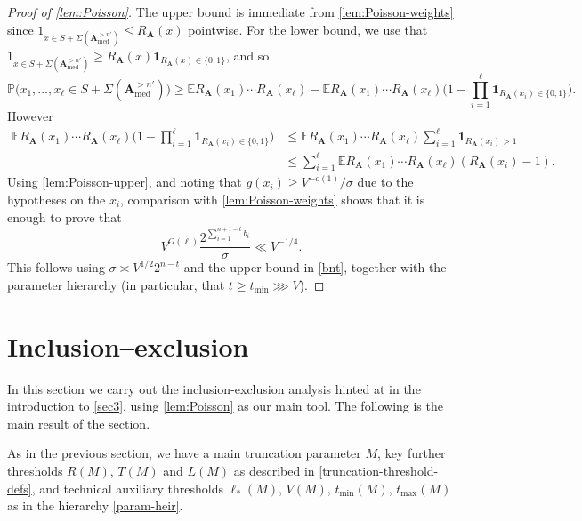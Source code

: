 \documentclass[11pt,reqno]{amsart}
\numberwithin{equation}{section}
\theoremstyle{definition}
\theoremstyle{remark}
\newcommand{\mb}{\mathbb}
\newcommand{\mbf}{\mathbf}
\renewcommand{\le}{\leqslant}
\renewcommand{\ge}{\geqslant}
\def\med{\operatorname{med}}
\begin{document}
\begin{proof}[Proof of \cref{lem:Poisson}]
The upper bound is immediate from \cref{lem:Poisson-weights} since $1_{x \in S + \Sigma(\mbf{A}^{> n'}_{\med})} \le R_{\mbf{A}}(x)$ pointwise. 
For the lower bound, we use that $1_{x \in S + \Sigma(\mbf{A}^{> n'}_{\med})} \ge R_{\mbf{A}}(x)  \mathbf{1}_{R_{\mbf{A}}(x)\in \{0,1\}}$, and so 
\[ \mb{P}\big(x_1, \dots, x_{\ell} \in S + \Sigma(\mbf{A}^{> n'}_{\med})\big) \ge \mb{E} R_{\mbf{A}}(x_1) \cdots R_{\mbf{A}}(x_{\ell}) - \mb{E} R_{\mbf{A}}(x_1) \cdots R_{\mbf{A}}(x_{\ell}) \big(1 - \prod_{i = 1}^{\ell} \mathbf{1}_{R_{\mbf{A}}(x_i) \in \{0,1\}}\big).\]
However
\begin{align*}
 \mb{E} R_{\mbf{A}}(x_1) \cdots R_{\mbf{A}}(x_{\ell}) \big(1 - \prod_{i = 1}^{\ell} \mathbf{1}_{R_{\mbf{A}}(x_i) \in \{0,1\}}\big) &\le  \mb{E} R_\mbf{A}(x_1) \cdots R_{\mbf{A}}(x_{\ell}) \sum_{i = 1}^{\ell} \mathbf{1}_{R_{\mbf{A}}(x_i) > 1} \\
&\le \sum_{i=1}^{\ell}\mb{E} R_{\mbf{A}}(x_1) \cdots R_{\mbf{A}}(x_{\ell}) (R_{\mbf{A}}(x_i)-1).
\end{align*}
Using \cref{lem:Poisson-upper}, and noting that $g(x_i) \ge V^{-o(1)}/\sigma$ due to the hypotheses on the $x_i$, comparison with \cref{lem:Poisson-weights} shows that it is enough to prove that 
\begin{equation*} V^{O(\ell)} \frac{2^{\sum_{i=1}^{n + 1 - t} b_i}}{\sigma} \ll V^{-1/4}.\end{equation*}
This follows using $\sigma \asymp V^{1/2} 2^{n - t}$ and the upper bound in \cref{bnt}, together with the parameter hierarchy (in particular, that $t \ge t_{\min} \ggg V$).
\end{proof}

\section{Inclusion--exclusion}\label{sec4}

In this section we carry out the inclusion-exclusion analysis hinted at in the introduction to \cref{sec3}, using \cref{lem:Poisson} as our main tool. The following is the main result of the section.

As in the previous section, we have a main truncation parameter $M$, key further thresholds $R(M)$, $T(M)$ and $L(M)$ as described in \cref{truncation-threshold-defs}, and technical auxiliary thresholds $\ell_*(M)$, $V(M)$, $t_{\min}(M)$, $t_{\max}(M)$ as in the hierarchy \cref{param-heir}.
\end{document}
